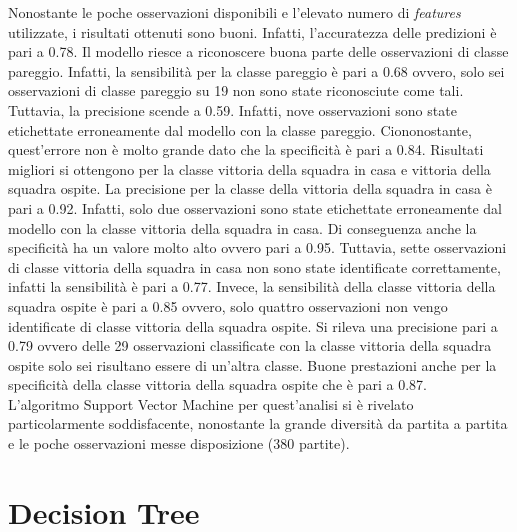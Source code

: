 Nonostante le poche osservazioni disponibili e l'elevato numero di \emph{features} utilizzate, i risultati ottenuti sono buoni. Infatti, l'accuratezza delle predizioni è pari a 0.78. Il modello riesce a riconoscere buona parte delle osservazioni di classe pareggio. Infatti, la sensibilità per la classe pareggio è pari a 0.68 ovvero, solo sei osservazioni di classe pareggio su 19 non sono state riconosciute come tali. Tuttavia, la precisione scende a 0.59. Infatti, nove osservazioni sono state etichettate erroneamente dal modello con la classe pareggio. Ciononostante, quest'errore non è molto grande dato che la specificità è pari a 0.84. Risultati migliori si ottengono per la classe vittoria della squadra in casa e vittoria della squadra ospite. La precisione per la classe della vittoria della squadra in casa è pari a 0.92. Infatti, solo due osservazioni sono state etichettate erroneamente dal modello con la classe vittoria della squadra in casa. Di conseguenza anche la specificità ha un valore molto alto ovvero pari a 0.95. Tuttavia, sette osservazioni di classe vittoria della squadra in casa non sono state identificate correttamente, infatti la sensibilità è pari a 0.77. Invece, la sensibilità della classe vittoria della squadra ospite è pari a 0.85 ovvero, solo quattro osservazioni non vengo identificate di classe vittoria della squadra ospite. Si rileva una precisione pari a 0.79 ovvero delle 29 osservazioni classificate con la classe vittoria della squadra ospite solo sei risultano essere di un'altra classe. Buone prestazioni anche per la specificità della classe vittoria della squadra ospite che è pari a 0.87.\\
L'algoritmo Support Vector Machine per quest'analisi si è rivelato particolarmente soddisfacente, nonostante la grande diversità da partita a partita e le poche osservazioni messe disposizione (380 partite).


\section{Decision Tree}

